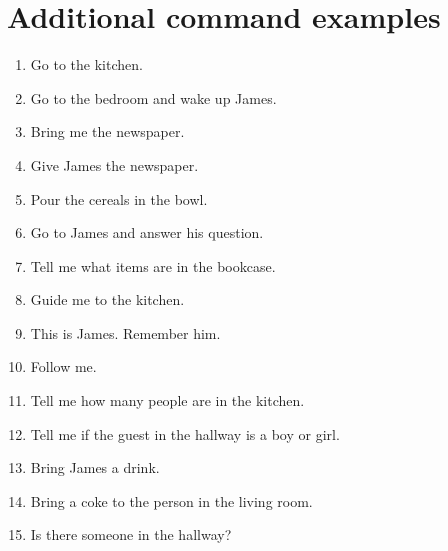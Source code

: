 \section{Additional command examples}
\begin{enumerate}
	\item Go to the kitchen.
	\item Go to the bedroom and wake up James.
	\item Bring me the newspaper.
	\item Give James the newspaper.
	\item Pour the cereals in the bowl.
	\item Go to James and answer his question.
	\item Tell me what items are in the bookcase.
	\item Guide me to the kitchen.
	\item This is James. Remember him.
	\item Follow me.
	\item Tell me how many people are in the kitchen.
	\item Tell me if the guest in the hallway is a boy or girl.
	\item Bring James a drink.
	\item Bring a coke to the person in the living room.
	\item Is there someone in the hallway?
\end{enumerate}


